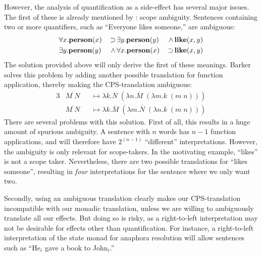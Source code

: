 \documentclass[a4paper]{article}
\begin{document}
However, the analysis of quantification as a side-effect has several
major issues. The first of these is already mentioned by
\citet{barker2004}: scope ambiguity. Sentences containing two or
more quantifiers, such as ``Everyone likes someone,'' are ambiguous:
\begin{alignat*}{3}
  &\forall x.\mathbf{person}(x) \,&\supset \,&\exists y.\mathbf{person}(y) \,&\wedge  \,&\mathbf{like}(x,y)\\
  &\exists y.\mathbf{person}(y) \,&\wedge  \,&\forall x.\mathbf{person}(x) \,&\supset \,&\mathbf{like}(x,y)
\end{alignat*}
The solution provided above will only derive the first of these
meanings. Barker solves this problem by adding another possible
translation for function application, thereby making the
CPS-translation ambiguous:
\begin{alignat*}{3}
  &\overline{M\;N} &&\mapsto \lambda k. \overline{N}\;(\lambda
  n.\overline{M}\;(\lambda m.k\;(m\;n)))\\
  &\overline{M\;N} &&\mapsto \lambda k. \overline{M}\;(\lambda
  m.\overline{N}\;(\lambda n.k\;(m\;n)))
\end{alignat*}
There are several problems with this solution. First of all, this
results in a huge amount of spurious ambiguity. A sentence with $n$
words has $n-1$ function applications, and will therefore have
$2^{(n-1)}$ ``different'' interpretations. However, the ambiguity is
only relevant for scope-takers. In the motivating example, ``likes''
is not a scope taker. Nevertheless, there are two possible
translations for ``likes someone'', resulting in \emph{four}
interpretations for the sentence where we only want two.

Secondly, using an ambiguous translation clearly makes our
CPS-translation incompatible with our monadic translation, unless we
are willing to ambiguously translate all our effects. But doing so is
risky, as a right-to-left interpretation may not be desirable for
effects other than quantification. For instance, a right-to-left
interpretation of the state monad for anaphora resolution will allow
sentences such as ``He$_i$ gave a book to John$_i$.''


%
%
%
%





%
%
\end{document}
